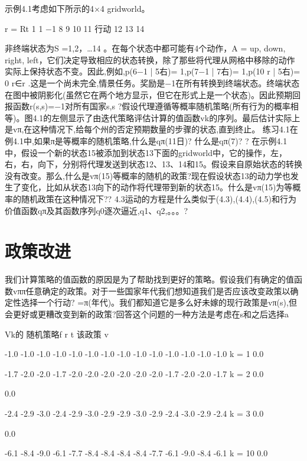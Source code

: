 示例4.1考虑如下所示的4×4 gridworld。

					r =
Rt	1 1
−1
	8	9	10	11		
行动	12	13	14			

非终端状态为S ={1,2，…14 }。在每个状态中都可能有4个动作，A = {up, down, right, left}，它们决定导致相应的状态转换，除了那些将代理从网格中移除的动作实际上保持状态不变。因此,例如,p(6−1 | 5右)= 1,p(7−1 | 7右)= 1,p(10 r | 5右)= 0 r∈r .这是一个尚未完全,情景任务。奖励是−1在所有转换到终端状态。终端状态在图中被阴影化(虽然它在两个地方显示，但它在形式上是一个状态)。因此预期回报函数r(s,s)=−1对所有国家s,s ?假设代理遵循等概率随机策略(所有行为的概率相等)。图4.1的左侧显示了由迭代策略评估计算的值函数{vk}的序列。最后估计实际上是vπ,在这种情况下,给每个州的否定预期数量的步骤的状态,直到终止。
练习4.1在例4.1中,如果π是等概率的随机策略,什么是qπ(11日)?
什么是qπ(7)? 					?
在示例4.1中，假设一个新的状态15被添加到状态13下面的gridworld中，它的操作，左，右，右，向下，分别将代理发送到状态12、13、14和15。假设来自原始状态的转换没有改变。那么,什么是vπ(15)等概率的随机的政策?现在假设状态13的动力学也发生了变化，比如从状态13向下的动作将代理带到新的状态15。什么是vπ(15)为等概率的随机政策在这种情况下??
4.3运动的方程是什么类似于(4.3),(4.4),(4.5)和行为价值函数qπ及其函数序列q0逐次逼近,q1、q2,。。。?

\section{政策改进}

我们计算策略的值函数的原因是为了帮助找到更好的策略。假设我们有确定的值函数vππ任意确定的政策。对于一些国家年代我们想知道我们是否应该改变政策以确定性选择一个行动? =π(年代)。我们都知道它是多么好未嫁的现行政策是vπ(s),但会更好或更糟改变到新的政策?回答这个问题的一种方法是考虑在s和之后选择a

Vk的
随机策略f r t
该政策
v
 


-1.0 -1.0 -1.0 -1.0 -1.0 -1.0 -1.0 -1.0 -1.0 -1.0 -1.0 -1.0 -1.0 -1.0
k = 1
0.0



-1.7 -2.0 -2.0 -1.7 -2.0 -2.0 -2.0 -2.0 -2.0 -2.0 -1.7 -2.0 -2.0 -1.7
k = 2
0.0




0.0




-2.4 -2.9 -3.0 -2.4 -2.9 -3.0 -2.9 -2.9 -3.0 -2.9 -2.4 -3.0 -2.9 -2.4
k = 3
0.0


0.0

-6.1 -8.4 -9.0 -6.1 -7.7 -8.4 -8.4 -8.4 -8.4 -7.7 -6.1 -9.0 -8.4 -6.1
k = 10
0.0


